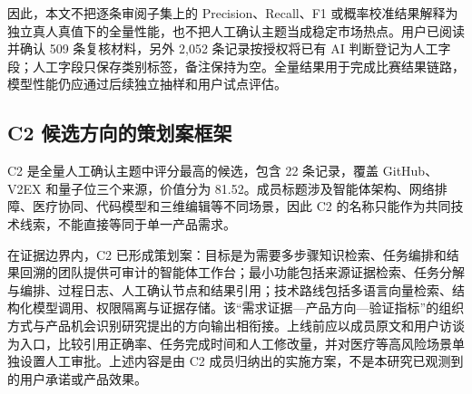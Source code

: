 因此，本文不把逐条审阅子集上的 Precision、Recall、F1 或概率校准结果解释为独立真人真值下的全量性能，也不把人工确认主题当成稳定市场热点。用户已阅读并确认 509 条复核材料，另外 2,052 条记录按授权将已有 AI 判断登记为人工字段；人工字段只保存类别标签，备注保持为空。全量结果用于完成比赛结果链路，模型性能仍应通过后续独立抽样和用户试点评估。

\subsection{C2 候选方向的策划案框架}

C2 是全量人工确认主题中评分最高的候选，包含 22 条记录，覆盖 GitHub、V2EX 和量子位三个来源，价值分为 81.52。成员标题涉及智能体架构、网络排障、医疗协同、代码模型和三维编辑等不同场景，因此 C2 的名称只能作为共同技术线索，不能直接等同于单一产品需求。

在证据边界内，C2 已形成策划案：目标是为需要多步骤知识检索、任务编排和结果回溯的团队提供可审计的智能体工作台；最小功能包括来源证据检索、任务分解与编排、过程日志、人工确认节点和结果引用；技术路线包括多语言向量检索、结构化模型调用、权限隔离与证据存储。该“需求证据—产品方向—验证指标”的组织方式与产品机会识别研究提出的方向输出相衔接\cite{li2026productopportunity}。上线前应以成员原文和用户访谈为入口，比较引用正确率、任务完成时间和人工修改量，并对医疗等高风险场景单独设置人工审批。上述内容是由 C2 成员归纳出的实施方案，不是本研究已观测到的用户承诺或产品效果。
